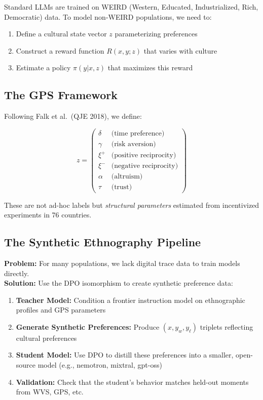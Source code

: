 \documentclass[11pt]{article}
\newcommand{\1}{\mathbf{1}}
\theoremstyle{plain}
\theoremstyle{definition}
\theoremstyle{remark}
\begin{document}
Standard LLMs are trained on WEIRD (Western, Educated, Industrialized, Rich, Democratic) data. To model non-WEIRD populations, we need to:

\begin{enumerate}
\item Define a cultural state vector $z$ parameterizing preferences
\item Construct a reward function $R(x,y;z)$ that varies with culture
\item Estimate a policy $\pi(y|x,z)$ that maximizes this reward
\end{enumerate}

\subsection{The GPS Framework}

Following Falk et al.\ (QJE 2018), we define:

$$
z = \begin{pmatrix}
\delta & \text{(time preference)} \\
\gamma & \text{(risk aversion)} \\
\xi^+ & \text{(positive reciprocity)} \\
\xi^- & \text{(negative reciprocity)} \\
\alpha & \text{(altruism)} \\
\tau & \text{(trust)}
\end{pmatrix}
$$

These are not ad-hoc labels but \emph{structural parameters} estimated from incentivized experiments in 76 countries.

\subsection{The Synthetic Ethnography Pipeline}

\textbf{Problem:} For many populations, we lack digital trace data to train models directly.
\\
\textbf{Solution:} Use the DPO isomorphism to create synthetic preference data:

\begin{enumerate}
\item \textbf{Teacher Model:} Condition a frontier instruction model on ethnographic profiles and GPS parameters
\item \textbf{Generate Synthetic Preferences:} Produce $(x, y_w, y_\ell)$ triplets reflecting cultural preferences
\item \textbf{Student Model:} Use DPO to distill these preferences into a smaller, open-source model (e.g., nemotron, mixtral, gpt-oss)
\item \textbf{Validation:} Check that the student's behavior matches held-out moments from WVS, GPS, etc.
\end{enumerate}
\end{document}
